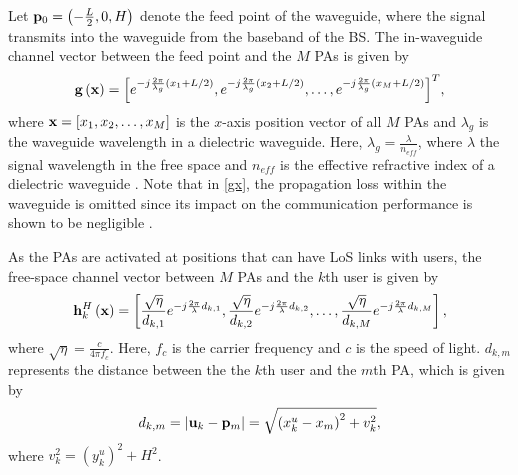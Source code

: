 \documentclass[summary]{ursi}
\begin{document}
Let ${{\bf{p}}_0} = \left( { - \frac{L}{2},0,H} \right)$ denote the feed point of the waveguide, where the signal transmits into the waveguide from the baseband of the BS. The in-waveguide channel vector between the feed point and the $M$ PAs is given by 
\begin{equation}
  \label{gx}
{\bf{g}}\left( {\bf{x}} \right) = {\left[ {{e^{ - j\frac{{2\pi }}{{{\lambda _g}}}\left( {{x_1} + {L \mathord{\left/
 {\vphantom {L 2}} \right.
 \kern-\nulldelimiterspace} 2}} \right)}},{e^{ - j\frac{{2\pi }}{{{\lambda _g}}}\left( {{x_2} + {L \mathord{\left/
 {\vphantom {L 2}} \right.
 \kern-\nulldelimiterspace} 2}} \right)}}, \ldots ,{e^{ - j\frac{{2\pi }}{{{\lambda _g}}}\left( {{x_M} + {L \mathord{\left/
 {\vphantom {L 2}} \right.
 \kern-\nulldelimiterspace} 2}} \right)}}} \right]^T},
\end{equation}
where ${\bf{x}} = \left[ {{x_1},{x_2}, \ldots ,{x_M}} \right]$ is the $x$-axis position vector of all $M$ PAs and ${\lambda _g}$ is the waveguide wavelength in a dielectric waveguide. Here, ${\lambda _g} = \frac{\lambda }{{{n_{eff}}}}$, where ${\lambda }$ the signal wavelength in the free space and ${n_{eff}}$ is the effective refractive index of a dielectric waveguide \cite{Ding}. Note that in \eqref{gx}, the propagation loss within the waveguide is omitted since its impact on the communication performance is shown to be negligible \cite{Kaidi}.

As the PAs are activated at positions that can have LoS links with users, the free-space channel vector between $M$ PAs and the $k$th user is given by
\begin{equation}
  \label{hkx}
{{\bf{h}}_k^H}\left( {\bf{x}} \right) = \left[ {\frac{{\sqrt \eta  }}{{{d_{k,1}}}}{e^{ - j\frac{{2\pi }}{\lambda }{d_{k,1}}}},\frac{{\sqrt \eta  }}{{{d_{k,2}}}}{e^{ - j\frac{{2\pi }}{\lambda }{d_{k,2}}}}, \ldots ,\frac{{\sqrt \eta  }}{{{d_{k,M}}}}{e^{ - j\frac{{2\pi }}{\lambda }{d_{k,M}}}}} \right],
\end{equation}
where ${\sqrt \eta  }  = \frac{c}{{4\pi {f_c}}}$. Here, $f_c$ is the carrier frequency and $c$ is the speed of light. ${d_{k,m}}$ represents the distance between the the $k$th user and the $m$th PA, which is given by
\begin{equation}
  \label{dkm}
{d_{k,m}} = \left| {{{\bf{u}}_k} - {{\bf{p}}_m}} \right| = \sqrt {{{\left( {x_k^u - {x_m}} \right)}^2} + v_k^2},
\end{equation}
where $v_k^2 = {\left( {y_k^u} \right)^2} + {H^2}$.
\end{document}
